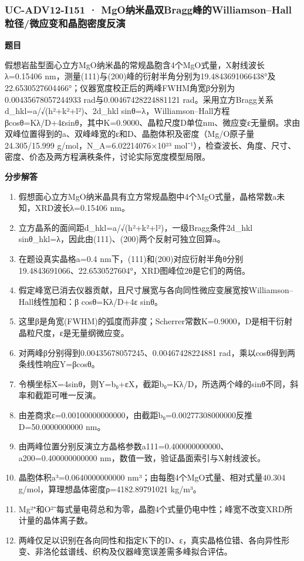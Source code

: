 \documentclass[UTF8,11pt,a4paper]{ctexart}
\begin{document}
\subsubsection*{UC-ADV12-I151 · MgO纳米晶双Bragg峰的Williamson–Hall粒径/微应变和晶胞密度反演}
\noindent\textbf{题目}\par
假想岩盐型面心立方MgO纳米晶的常规晶胞含4个MgO式量，X射线波长λ=0.15406 nm，测量(111)与(200)峰的衍射半角分别为19.4843691066438°及22.6530527604466°；仪器宽度校正后的两峰FWHM角宽β分别为0.00435678057244933 rad与0.00467428224881121 rad。采用立方Bragg关系d\_hkl=a/√(h²+k²+l²)、2d\_hkl sinθ=λ，Williamson–Hall方程βcosθ=Kλ/D+4εsinθ，其中K=0.9000、晶粒尺度D单位nm、微应变ε无量纲。求由双峰位置得到的a、双峰峰宽的ε和D、晶胞体积及密度（Mg/O原子量24.305/15.999 g/mol，N\_A=6.02214076×10²³ mol⁻¹），检查波长、角度、尺寸、密度、价态及两方程满秩条件，讨论实际宽度模型局限。\par
\medskip\noindent\textbf{分步解答}
\begin{enumerate}
\item 假想面心立方MgO纳米晶具有立方常规晶胞中4个MgO式量，晶格常数a未知，XRD波长λ=0.15406 nm。
\item 立方晶系的面间距d\_hkl=a/√(h²+k²+l²)，一级Bragg条件2d\_hkl sinθ\_hkl=λ，因此由(111)、(200)两个反射可独立回算a。
\item 在题设真实晶格a=0.4 nm下，(111)和(200)对应衍射半角θ分别19.4843691066、22.6530527604°，XRD图峰位2θ是它们的两倍。
\item 假定峰宽已消去仪器贡献，且尺寸展宽与各向同性微应变展宽按Williamson–Hall线性加和：β cosθ=Kλ/D+4ε sinθ。
\item 这里β是角宽(FWHM)的弧度而非度；Scherrer常数K=0.9000，D是相干衍射晶粒尺度，ε是无量纲微应变。
\item 对两峰β分别得到0.00435678057245、0.00467428224881 rad，乘以cosθ得到两条线性响应Y=βcosθ。
\item 令横坐标X=4sinθ，则Y=b₀+εX，截距b₀=Kλ/D，所选两个峰的sinθ不同，斜率和截距可唯一反演。
\item 由差商求ε=0.00100000000000，由截距b₀=0.00277308000000反推D=50.0000000000 nm。
\item 由两峰位置分别反演立方晶格参数a111=0.400000000000、a200=0.400000000000 nm，数值一致，验证晶面索引与X射线波长。
\item 晶胞体积a³=0.0640000000000 nm³；由每胞4个MgO式量、相对式量40.304 g/mol，算理想晶体密度ρ=4182.89791021 kg/m³。
\item Mg²⁺和O²⁻每式量电荷总和为零，晶胞4个式量仍电中性；峰宽不改变XRD所计量的晶体离子数。
\item 两峰仅足以识别在各向同性和指定K下的D、ε，真实晶格位错、各向异性形变、非洛伦兹谱线、织构及仪器峰宽误差需多峰拟合评估。
\end{enumerate}
\end{document}

